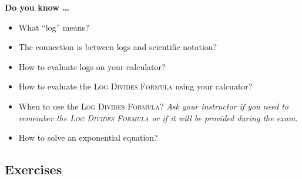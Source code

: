


\noindent \textbf{Do you know \ldots}

\begin{itemize} 
\item What ``log'' means? 
\item The connection is between logs and scientific notation? 
\item How to evaluate logs on your calculator? 
\item How to evaluate the \textsc{Log Divides Formula} using your calcuator? 
\item When to use the \textsc{Log Divides Formula}?  \emph{Ask your instructor if you need to remember the \textsc{Log Divides Formula} or if it will be provided during the exam.}
\item How to solve an exponential equation? 
  
\end{itemize}

\subsection*{Exercises}

